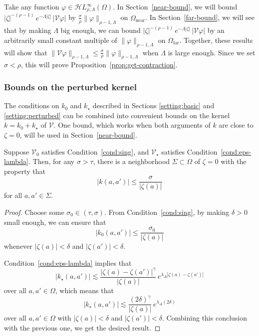 \documentclass[final]{siamart220329}
\newcommand{\singexp}[2]{\mathcal{H}L^\infty_{#1, #2}}
\newcommand{\volterra}{\mathcal{V}}
\newcommand{\hardpart}{\mathcal{V}_0}
\newcommand{\softpart}{\mathcal{V}_\star}
\newcommand{\kerwhole}{k}
\newcommand{\hardker}{k_0}
\newcommand{\softker}{k_\star}
\newcommand{\domain}{\Omega}
\newcommand{\near}{\Omega_\text{near}}
\newcommand{\far}{\Omega_\text{far}}
\begin{document}
Take any function $\varphi \in \singexp{\rho}{\Lambda}(\domain)$. In Section~\ref{near-bound}, we will bound $|\zeta|^{-(\rho-1)}\,e^{-\Lambda|\zeta|}\,|\volterra\varphi|$ by $\tfrac{\sigma}{\rho} \|\varphi\|_{\rho-1, \Lambda}$ on $\near$. In Section~\ref{far-bound}, we will see that by making $\Lambda$ big enough, we can bound $|\zeta|^{-(\rho-1)}\,e^{-\Lambda|\zeta|}\,|\volterra\varphi|$ by an arbitrarily small constant multiple of $\|\varphi\|_{\rho-1, \Lambda}$ on $\far$. Together, these results will show that $\|\volterra \varphi\|_{\rho-1, \Lambda} \le \tfrac{\sigma}{\rho} \|\varphi\|_{\rho-1, \Lambda}$ when $\Lambda$ is large enough. Since we set $\sigma < \rho$, this will prove Proposition~\ref{prop:get-contraction}.
\subsubsection{Bounds on the perturbed kernel}\label{sec:bounds on k}
The conditions on $\hardker$ and $\softker$ described in Sections \ref{setting:basic} and \ref{setting:perturbed} can be combined into convenient bounds on the kernel $\kerwhole = \hardker + \softker$ of $\volterra$. One bound, which works when both arguments of $\kerwhole$ are close to $\zeta = 0$, will be used in Section~\ref{near-bound}.
\begin{proposition}\label{prop:whole-ker-near-bound}
Suppose $\hardpart$ satisfies Condition~\eqref{cond:sing}, and $\softpart$ satisfies Condition~\eqref{cond:eps-lambda}. Then, for any $\sigma > \tau$, there is a neighborhood $\Sigma \subset \Omega$ of $\zeta = 0$ with the property that
\[ |\kerwhole(a, a')| \le \frac{\sigma}{|\zeta(a)|} \]
for all $a, a' \in \Sigma$.
\end{proposition}
\begin{proof}
Choose some $\sigma_0 \in (\tau, \sigma)$. From Condition~\eqref{cond:sing}, by making $\delta > 0$ small enough, we can ensure that
\[ |\hardker(a, a')| \le \frac{\sigma_0}{|\zeta(a)|} \]
whenever $|\zeta(a)| < \delta$ and $|\zeta(a')| < \delta$.

Condition~\eqref{cond:eps-lambda} implies that
\[ | \softker(a, a') | \lesssim\frac{|\zeta(a)-\zeta(a')|^\gamma}{|\zeta(a)|}\,e^{\lambda_\Delta|\zeta(a)-\zeta(a')|}\]
over all $a, a' \in \domain$, which means that
\[ | \softker(a, a') | \lesssim\frac{(2\delta)^\gamma}{|\zeta(a)|}\,e^{\lambda_\Delta(2\delta)}\]
over all $a, a' \in \domain$ with $|\zeta(a)| < \delta$ and $|\zeta(a')| < \delta$. Combining this conclusion with the previous one, we get the desired result.
\end{proof}
\end{document}
